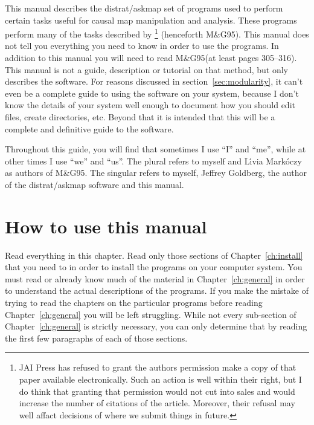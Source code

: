 \documentclass[%
	11pt,
        a4paper,
        twoside]{workrep}
\newcommand*{\prg}[1]{\textsf{#1}}		%
\newcommand{\dram}{\prg{distrat}/\prg{askmap}\xspace}	%
\newcommand{\MG}{M\&G95\xspace}			%
\begin{document}
This manual describes the \dram set of programs used to perform
certain tasks useful for causal map manipulation and analysis.  These
programs perform many of the tasks described by
\footnote{\label{fn:jai}%
  JAI Press has refused to grant the authors permission
  make a copy of that paper available electronically.
  Such an action is well within their right, but I do think that
  granting that permission would not cut into sales and would
  increase the number of citations of the article.  Moreover, their
  refusal may well affact decisions of where we submit things in
  future.}
(henceforth \MG).  This manual
does not tell you everything you need to know in order to use the
programs.  In addition to this manual you will need to read \MG (at
least pages 305--316).  This manual is not a guide, description or
tutorial on that method, but only describes the software.
For reasons discussed in section~\ref{sec:modularity}, it can't
even be a complete guide to using the software on your system, because
I don't know the details of your system well enough to document how
you should edit files, create directories, etc.  Beyond that it is
intended that this will be a complete and definitive guide to the software.

Throughout this guide, you will find that sometimes I use ``I'' and
``me'', while at other times I use ``we'' and ``us''.  The plural
refers to myself and L\'{\i}via Mark\'oczy as authors of \MG.  The
singular refers to myself, Jeffrey Goldberg, the author of the \dram
software and this manual.

\section{How to use this manual}\label{sec:howtoread}

Read everything in this chapter.  Read only those sections of
Chapter~\ref{ch:install} that you need to in order to install the
programs on your computer system.  You must read or already
know much of the material in Chapter~\ref{ch:general} in order
to understand the actual descriptions of the programs.  If you
make the mistake of trying to read the chapters on the particular
programs before reading Chapter~\ref{ch:general} you will be left
struggling.  While not every sub-section of Chapter~\ref{ch:general}
is strictly necessary, you can only determine that by reading the
first few paragraphs of each of those sections.
\end{document}
